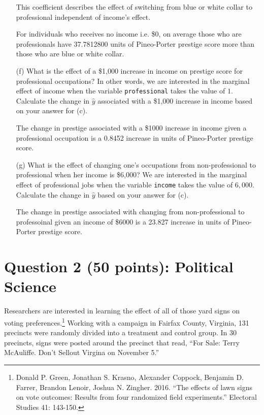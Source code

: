 \documentclass[12pt,letterpaper]{article}
\begin{document}
\begin{enumerate}
		\vspace{1cm}
		
	This coefficient describes the effect of switching from blue or white collar to professional independent of income's effect.
	
	For individuals who receives no income i.e. \$0, on average those who are professionals have 37.7812800 units of Pineo-Porter prestige score more than those who are blue or white collar.
	
		\vspace{1cm}
	
	\newpage
	\item [(f)]
	What is the effect of a \$1,000 increase in income on prestige score for professional occupations? In other words, we are interested in the marginal effect of income when the variable \texttt{professional} takes the value of $1$. Calculate the change in $\hat{y}$ associated with a \$1,000 increase in income based on your answer for (c).
	
	 
	
	The change in prestige associated with a \$1000 increase in income given a professional occupation is a 0.8452 increase in units of Pineo-Porter prestige score.
	
	\vspace{1cm}
	
	\item [(g)]
	What is the effect of changing one's occupations from non-professional to professional when her income is \$6,000? We are interested in the marginal effect of professional jobs when the variable \texttt{income} takes the value of $6,000$. Calculate the change in $\hat{y}$ based on your answer for (c).
	
	
	
	 The change in prestige associated with changing from non-professional to professoinal given an income of \$6000 is a 23.827 increase in units of Pineo-Porter prestige score.
	
\end{enumerate}

\newpage

\section*{Question 2 (50 points): Political Science}
\vspace{.25cm}
\noindent 	Researchers are interested in learning the effect of all of those yard signs on voting preferences.\footnote{Donald P. Green, Jonathan	S. Krasno, Alexander Coppock, Benjamin D. Farrer,	Brandon Lenoir, Joshua N. Zingher. 2016. ``The effects of lawn signs on vote outcomes: Results from four randomized field experiments.'' Electoral Studies 41: 143-150. } Working with a campaign in Fairfax County, Virginia, 131 precincts were randomly divided into a treatment and control group. In 30 precincts, signs were posted around the precinct that read, ``For Sale: Terry McAuliffe. Don't Sellout Virgina on November 5.'' \\
\end{document}
